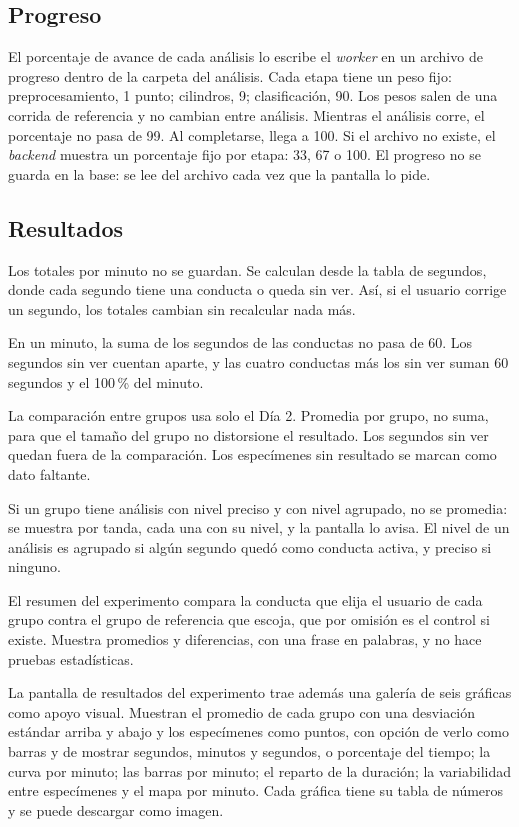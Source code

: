 \subsection{Progreso}

El porcentaje de avance de cada análisis lo escribe el \textit{worker} en un archivo de progreso dentro de la
carpeta del análisis. Cada etapa tiene un peso fijo: preprocesamiento, 1 punto; cilindros, 9; clasificación, 90. Los pesos salen de una
corrida de referencia y no cambian entre análisis.
Mientras el análisis corre, el porcentaje no pasa de 99. Al completarse, llega a 100. Si el archivo no existe,
el \textit{backend} muestra un porcentaje fijo por etapa: 33, 67 o 100. El progreso no se guarda en la base: se
lee del archivo cada vez que la pantalla lo pide.

\subsection{Resultados}

Los totales por minuto no se guardan. Se calculan desde la tabla de segundos, donde cada segundo tiene una
conducta o queda sin ver. Así, si el usuario corrige un segundo, los totales cambian sin recalcular nada más.

En un minuto, la suma de los segundos de las conductas no pasa de 60. Los segundos sin ver cuentan aparte, y las
cuatro conductas más los sin ver suman 60 segundos y el 100\,\% del minuto.

La comparación entre grupos usa solo el Día 2. Promedia por grupo, no suma, para que el tamaño del grupo no
distorsione el resultado. Los segundos sin ver quedan fuera de la comparación. Los especímenes sin resultado se
marcan como dato faltante.

Si un grupo tiene análisis con nivel preciso y con nivel agrupado, no se promedia: se muestra por tanda, cada una con su
nivel, y la pantalla lo avisa. El nivel de un análisis es agrupado si algún segundo quedó como conducta activa, y preciso
si ninguno.

El resumen del experimento compara la conducta que elija el usuario de cada grupo contra el grupo de referencia que
escoja, que por omisión es el control si existe. Muestra promedios y diferencias, con una frase en palabras, y no hace
pruebas estadísticas.

La pantalla de resultados del experimento trae además una galería de seis gráficas como apoyo visual. Muestran el
promedio de cada grupo con una desviación estándar arriba y abajo y los especímenes como puntos, con opción de verlo como
barras y de mostrar segundos, minutos y segundos, o porcentaje del tiempo; la curva por minuto; las barras por minuto; el
reparto de la duración; la variabilidad entre especímenes y el mapa por minuto. Cada gráfica tiene su tabla de números y
se puede descargar como imagen.


